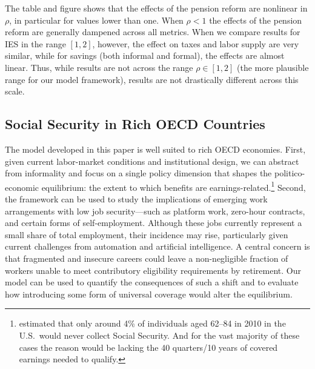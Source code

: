The table and figure shows that the effects of the pension reform are nonlinear in $\rho$, in particular for values lower than one. When $\rho<1$ the effects of the pension reform are generally dampened across all metrics. When we compare results for IES in the range $[1, 2]$, however, the effect on taxes and labor supply are very similar, while for savings (both informal and formal), the effects are almost linear. Thus, while results are not across the range $\rho\in[1,2]$ (the more plausible range for our model framework), results are not drastically different across this scale.





\subsection{Social Security in Rich OECD Countries}\label{sec:quant:OECD}

The model developed in this paper is well suited to rich OECD economies. First, given current labor-market conditions and institutional design, we can abstract from informality and focus on a single policy dimension that shapes the politico-economic equilibrium: the extent to which benefits are earnings-related.\footnote{\textcite{WhitmanRa1} estimated that only around 4\% of individuals aged 62–84 in 2010 in the U.S.\ would never collect Social Security. And for the vast majority of these cases the reason would be lacking the 40 quarters/10 years of covered earnings needed to qualify.} Second, the framework can be used to study the implications of emerging work arrangements with low job security—such as platform work, zero-hour contracts, and certain forms of self-employment. Although these jobs currently represent a small share of total employment, their incidence may rise, particularly given current challenges from automation and artificial intelligence. A central concern is that fragmented and insecure careers could leave a non-negligible fraction of workers unable to meet contributory eligibility requirements by retirement. Our model can be used to quantify the consequences of such a shift and to evaluate how introducing some form of universal coverage would alter the equilibrium.

